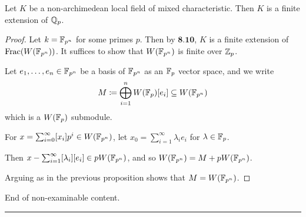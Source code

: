 \documentclass[10pt,a4paper]{article}
\begin{document}
\begin{theorem}
  Let $K$ be a non-archimedean local field of mixed characteristic. Then $K$ is a finite extension of $\mathbb{Q}_p$.
\end{theorem}
\begin{proof}
  Let $k = \mathbb{F}_{p^n}$ for some primes $p$. Then by $\textbf{8.10}$, $K$ is a finite extension of $\operatorname{Frac}(W(\mathbb{F}_{p^n}))$. It suffices to show that $W(\mathbb{F}_{p^n})$ is finite over $\mathbb{Z}_p$.

  Let $e_1, \ldots, e_n \in \mathbb{F}_{p^n}$ be a basis of $\mathbb{F}_{p^n}$ as an $\mathbb{F}_p$ vector space, and we write
  \[M \coloneqq \bigoplus_{i=1}^n W(\mathbb{F}_p)[e_i] \subseteq W(\mathbb{F}_{p^n})\]
  which is a $W(\mathbb{F}_p)$ submodule.

  For $x = \sum_{i=0}^\infty [x_i]p^i \in W(\mathbb{F}_{p^n})$, let $x_0 = \sum_{i=1}^\infty \lambda_i e_i$ for $\lambda \in \mathbb{F}_p$.

  Then $x - \sum_{i=1}^\infty [\lambda_i][e_i] \in pW(\mathbb{F}_{p^n})$, and so $W(\mathbb{F}_{p^n}) = M+pW(\mathbb{F}_{p^n})$.

  Arguing as in the previous proposition shows that $M = W(\mathbb{F}_{p^n})$.
\end{proof}
End of non-examinable content.\\
\hrule
\end{document}
